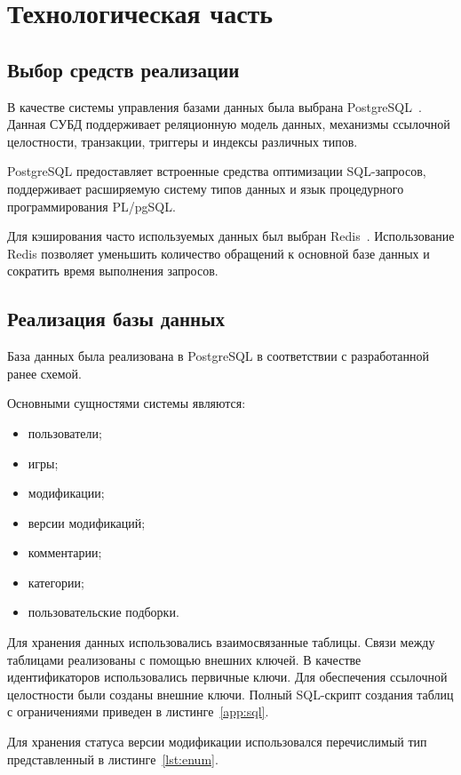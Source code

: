 \chapter{Технологическая часть}

\section{Выбор средств реализации}

В качестве системы управления базами данных была выбрана PostgreSQL~\cite{postgresql}.
Данная СУБД поддерживает реляционную модель данных, механизмы
ссылочной целостности, транзакции, триггеры и индексы различных типов.

PostgreSQL предоставляет встроенные средства оптимизации SQL-запросов,
поддерживает расширяемую систему типов данных и язык процедурного
программирования PL/pgSQL.

Для кэширования часто используемых данных был выбран Redis~\cite{redis}.
Использование Redis позволяет уменьшить количество обращений к основной
базе данных и сократить время выполнения запросов.

\section{Реализация базы данных}

База данных была реализована в PostgreSQL в соответствии с разработанной
ранее схемой.

Основными сущностями системы являются:

\begin{itemize}
	\item пользователи;
	\item игры;
	\item модификации;
	\item версии модификаций;
	\item комментарии;
	\item категории;
	\item пользовательские подборки.
\end{itemize}

Для хранения данных использовались взаимосвязанные таблицы.
Связи между таблицами реализованы с помощью внешних ключей.
В качестве идентификаторов использовались первичные ключи.
Для обеспечения ссылочной целостности были созданы внешние ключи.
Полный SQL-скрипт создания таблиц с ограничениями приведен в листинге~\ref{app:sql}.

Для хранения статуса версии модификации использовался перечислимый тип представленный в листинге~\ref{lst:enum}.


